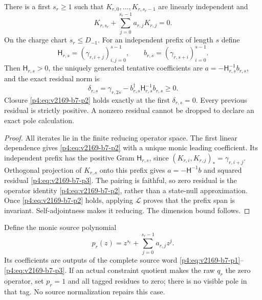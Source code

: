 \documentclass[12pt,a4paper]{article}
\begin{document}
\begin{theorem}
\label{p4:v2169:b7:thm:closure}
There is a first $s_r\geq1$ such that
$K_{r,0},\ldots,K_{r,s_r-1}$ are linearly independent and
\begin{equation}
 K_{r,s_r}+\sum_{j=0}^{s_r-1}a_{r,j}K_{r,j}=0.
 \label{p4:eq:v2169-b7-p2}
\end{equation}
On the charge chart $s_r\leq D_{-1}$. For an independent prefix of length
$s$ define
\[
 \mathsf H_{r,s}=(\gamma_{r,i+j})_{i,j=0}^{s-1},\qquad
 b_{r,s}=(\gamma_{r,s+i})_{i=0}^{s-1}.
\]
Then $\mathsf H_{r,s}>0$, the uniquely generated tentative coefficients are
$a=-\mathsf H_{r,s}^{-1}b_{r,s}$, and the exact residual norm is
\begin{equation}
 \delta_{r,s}=\gamma_{r,2s}
       -b_{r,s}^\dagger\mathsf H_{r,s}^{-1}b_{r,s}\geq0.
 \label{p4:eq:v2169-b7-p3}
\end{equation}
Closure \eqref{p4:eq:v2169-b7-p2} holds exactly at the first $\delta_{r,s}=0$. Every previous
residual is strictly positive. A nonzero residual cannot be dropped to
declare an exact pole calculation.
\end{theorem}
\begin{proof}
All iterates lie in the finite reducing operator space. The first linear
dependence gives \eqref{p4:eq:v2169-b7-p2} with a unique monic leading coefficient. Its independent
prefix has the positive Gram $\mathsf H_{r,s}$, since
$(K_{r,i},K_{r,j})_* =\gamma_{r,i+j}$. Orthogonal projection of $K_{r,s}$
onto this prefix gives $a=-\mathsf H^{-1}b$ and squared residual \eqref{p4:eq:v2169-b7-p3}.
The pairing is faithful, so zero residual is the operator identity \eqref{p4:eq:v2169-b7-p2},
rather than a state-null approximation. Once \eqref{p4:eq:v2169-b7-p2} holds, applying
$\mathcal L$ proves that the prefix span is invariant. Self-adjointness
makes it reducing. The dimension bound follows.
\end{proof}

Define the monic source polynomial
\begin{equation}
 \boxed{p_r(z)=z^{s_r}+\sum_{j=0}^{s_r-1}a_{r,j}z^j.}
 \label{p4:eq:v2169-b7-p4}
\end{equation}
Its coefficients are outputs of the complete source word \eqref{p4:eq:v2169-b7-p1}--\eqref{p4:eq:v2169-b7-p3}.
If an actual constraint quotient makes the raw $q_r$ the zero operator,
set $p_r=1$ and all tagged residues to zero; there is no visible pole in
that tag. No source normalization repairs this case.
\end{document}
